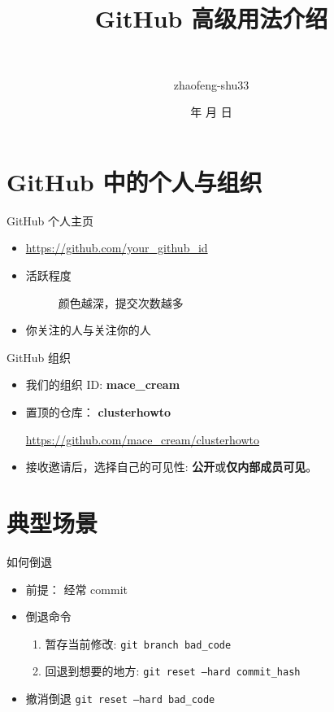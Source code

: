\documentclass[notheorems,xetex]{beamer}
\title{GitHub 高级用法介绍} %
\author[赵丰]
{\quad {赵丰}\\ \and {zhaofeng-shu33}}
\institute[清华大学] %
{\normalsize\quad
  Lab2c 服务器使用培训
}
\date{\the\year 年 \the\month 月 \the\day 日}
\begin{document}
\frame{\titlepage}
\frame{\tableofcontents}
\section{GitHub 中的个人与组织}
\begin{frame}{GitHub 个人主页}
\begin{itemize}
	\item \url{https://github.com/your_github_id}
	\item 活跃程度
     \begin{figure}
	\caption*{颜色越深，提交次数越多}
	\end{figure}
	\item 你关注的人与关注你的人
	\begin{figure}
	\end{figure}
\end{itemize}
\end{frame}
\begin{frame}{GitHub 组织}
     \begin{figure}
	    \centering
	\end{figure}
\begin{itemize}
	\item 我们的组织 ID: \textbf{mace\_cream}
	\item 置顶的仓库： \textbf{clusterhowto}
	
	\url{https://github.com/mace_cream/clusterhowto}
	\item 接收邀请后，选择自己的可见性: \textbf{公开}或\textbf{仅内部成员可见}。
\end{itemize}
\end{frame}
\section{典型场景}
\frame{\tableofcontents[currentsection]}
\begin{frame}{如何倒退}
\begin{itemize}
	\item 前提： 经常 commit
	\item 倒退命令
	\begin{enumerate}
		\item 暂存当前修改: \texttt{git branch bad\_code}
		\item 回退到想要的地方: \texttt{git reset --hard commit\_hash}
	\end{enumerate}
	\item 撤消倒退 \texttt{git reset --hard bad\_code}
\end{itemize}
\begin{figure}
\end{figure}
\end{frame}
\end{document}

